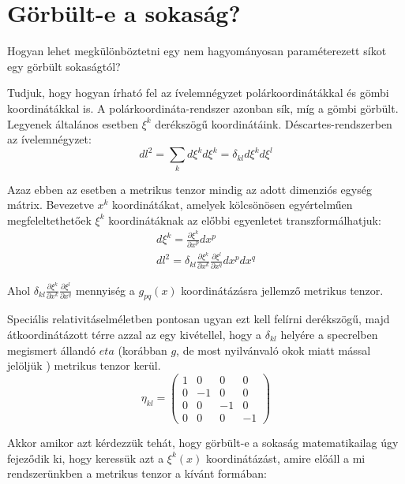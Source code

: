 \documentclass[a4paper,12pt]{article}
\begin{document}
\section{ Görbült-e a sokaság?}
\par Hogyan lehet megkülönböztetni egy nem hagyományosan paraméterezett síkot egy görbült sokaságtól?
\par Tudjuk, hogy hogyan írható fel az ívelemnégyzet polárkoordinátákkal és gömbi koordinátákkal is. A polárkoordináta-rendszer azonban sík, míg a gömbi görbült. Legyenek általános esetben $\xi^{k}$ derékszögű koordinátáink. Déscartes-rendszerben az ívelemnégyzet:
\begin{equation*}
    dl^{2} = \sum_{k}d\xi^{k}d\xi^{k} = \delta_{kl}d\xi^{k}d\xi^{l}
\end{equation*}
\par Azaz ebben az esetben a metrikus tenzor mindig az adott dimenziós egység mátrix. Bevezetve $x^{k}$ koordinátákat, amelyek kölcsönösen egyértelműen megfeleltethetőek $\xi^{k}$ koordinátáknak az előbbi egyenletet transzformálhatjuk:
\begin{align*}
    d\xi^{k} = \frac{\partial \xi^{k}}{\partial x^{p}}dx^{p} \\
    dl^{2} = \delta_{kl}\frac{\partial \xi^{k}}{\partial x^{k}}\frac{\partial \xi^{l}}{\partial x^{q}}dx^{p}dx^{q}
\end{align*}
\par Ahol $\delta_{kl}\frac{\partial \xi^{k}}{\partial x^{k}}\frac{\partial \xi^{l}}{\partial x^{q}}$ mennyiség a $g_{pq}(x)$ koordinátázásra jellemző metrikus tenzor.
\par Speciális relativitáselméletben pontosan ugyan ezt kell felírni derékszögű, majd átkoordinátázott térre azzal az egy kivétellel, hogy a $\delta_{kl}$ helyére a specrelben megismert állandó $eta$ (korábban $g$, de most nyilvánvaló okok miatt mással jelöljük ) metrikus tenzor kerül.
\begin{equation*}
    \eta_{kl} = \left(\begin{array}{cccc} 1&0&0&0\\ 0&-1&0&0\\ 0&0&-1&0\\0&0&0&-1 \end{array}\right)
\end{equation*}
\par Akkor amikor azt kérdezzük tehát, hogy görbült-e a sokaság matematikailag úgy fejeződik ki, hogy keressük azt a $\xi^{k}(x)$ koordinátázást, amire előáll a mi rendszerünkben a metrikus tenzor a kívánt formában:
\end{document}
